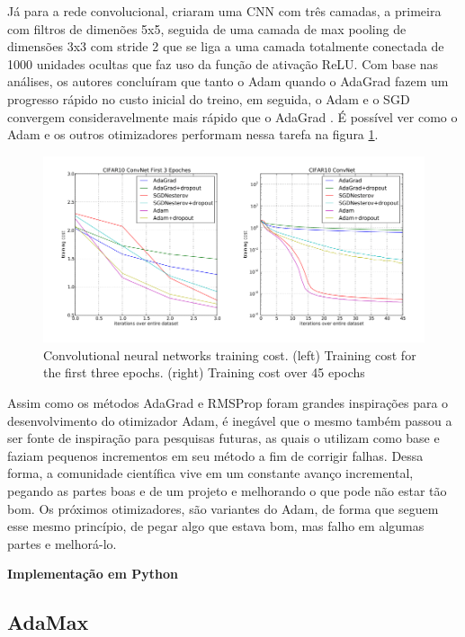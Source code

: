 Já para a rede convolucional, \textcite{AdamMethod} criaram uma CNN com três camadas, a primeira com filtros de dimenões 5x5, seguida de uma camada de max pooling de dimensões 3x3 com stride 2 que se liga a uma camada totalmente conectada de 1000 unidades ocultas que faz uso da função de ativação ReLU. Com base nas análises, os autores concluíram que tanto o Adam quando o AdaGrad fazem um progresso rápido no custo inicial do treino, em seguida, o Adam e o SGD convergem consideravelmente mais rápido que o AdaGrad \parencite{AdamMethod}. É possível ver como o Adam e os outros otimizadores performam nessa tarefa na figura \ref{fig:comparativo-adam-convnet}.

\begin{figure}[h]
    \centering
    \includegraphics[width=0.85\linewidth]{../imagens/retropropagacao-gradiente/comparativo-adam-convnet.png}
    \caption{Convolutional neural networks training cost. (left) Training cost for the first three epochs. (right) Training cost over 45 epochs}
    \label{fig:comparativo-adam-convnet}
\end{figure}

Assim como os métodos AdaGrad e RMSProp foram grandes inspirações para o desenvolvimento do otimizador Adam, é inegável que o mesmo também passou a ser fonte de inspiração para pesquisas futuras, as quais o utilizam como base e faziam pequenos incrementos em seu método a fim de corrigir falhas. Dessa forma, a comunidade científica vive em um constante avanço incremental, pegando as partes boas e de um projeto e melhorando o que pode não estar tão bom. Os próximos otimizadores, são variantes do Adam, de forma que seguem esse mesmo princípio, de pegar algo que estava bom, mas falho em algumas partes e melhorá-lo.

\textbf{Implementação em Python}

\subsection{AdaMax}

